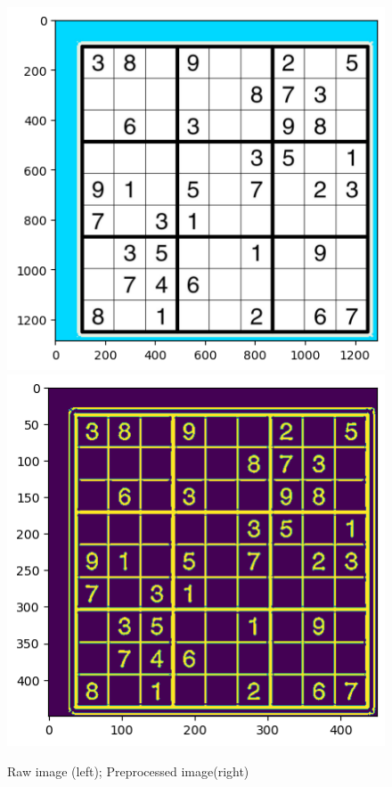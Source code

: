\documentclass[conference]{IEEEtran}
\begin{document}
\begin{figure}[htbp]
\centerline{
    \includegraphics[scale=0.4]{assets/raw.png}
    \includegraphics[scale=0.4]{assets/preprocess.png}
}
\caption{Raw image (left); Preprocessed image(right)}
\label{preprocessing_step}
\end{figure}
\end{document}
